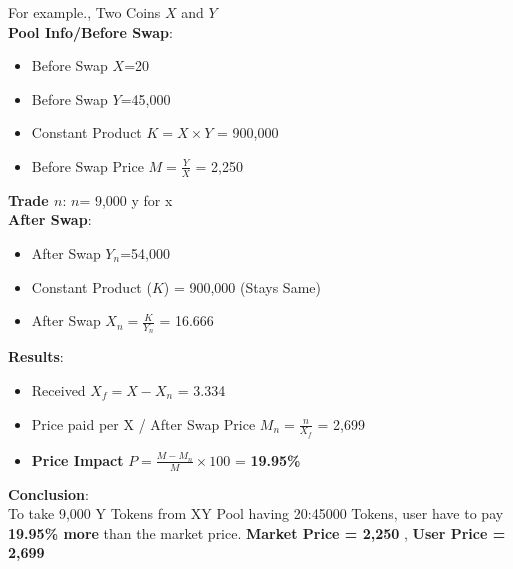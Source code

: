 \documentclass[letterpaper,11pt]{article}
\begin{document}
For example., Two Coins $X$ and $Y$\\

\textbf{Pool Info/Before Swap}:
\begin{itemize}[wide, labelwidth=!, labelindent=0pt]
\item Before Swap $X$=20
\item Before Swap $Y$=45,000
\item Constant Product $K=X \times  Y$ = 900,000 
\item Before Swap Price $M=\frac{Y}{X}$ = 2,250 
\end{itemize}

\textbf{Trade $n$}: $n$= 9,000 y for x\\

\textbf{After Swap}:
\begin{itemize}[wide, labelwidth=!, labelindent=0pt]
\item After Swap $Y_n$=54,000 
\item Constant Product ($K$) = 900,000 (Stays Same)
\item After Swap $X_n=\frac{K}{Y_n}$ = 16.666  
\end{itemize}
\textbf{Results}:
\begin{itemize}[wide, labelwidth=!, labelindent=0pt]
\item Received $X_f={{X}-{X_n}}$ = 3.334 
\item Price paid per X / After Swap Price $M_n={\frac{n}{X_f}}$  = 2,699  
\item \textbf{Price Impact} $P={\frac{M - M_n}{M} \times  100}$ = \textbf{19.95\% }
\end{itemize}


\textbf{Conclusion}:\\

To take 9,000 Y Tokens from XY Pool having 20:45000 Tokens, user have to pay \textbf{19.95\% more} than the market price. \textbf{Market Price = 2,250} , \textbf{User Price = 2,699}\\
\end{document}
